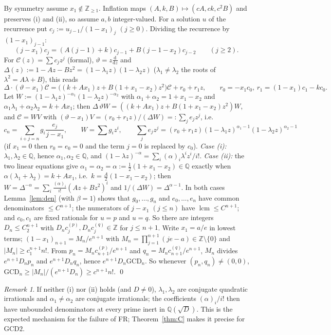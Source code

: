 \documentclass[11pt]{amsart}
\theoremstyle{definition}
\theoremstyle{remark}
\newtheorem{remark}[lemma]{Remark}
\numberwithin{equation}{section}
\newcommand{\Q}{\mathbb{Q}}
\newcommand{\Z}{\mathbb{Z}}
\newcommand{\GCD}{\mathrm{GCD}}
\newcommand{\lcm}{\operatorname{lcm}}
\begin{document}
By symmetry assume $x_1\notin\Z_{\ge1}$. Inflation maps $(A,k,B)\mapsto(cA,ck,c^2B)$ and preserves (i) and (ii), so assume $a,b$ integer-valued. For a solution $u$ of the recurrence put $c_j:=u_{j-1}/(1-x_1)_j$ $(j\ge0)$. Dividing the recurrence by $(1-x_1)_{j-1}$:
\[
(j-x_1)c_j=(A(j-1)+k)c_{j-1}+B(j-1-x_2)c_{j-2}\qquad(j\ge2).
\]
For $\mathcal C(z)=\sum c_jz^j$ (formal), $\vartheta=z\frac{\mathrm d}{\mathrm dz}$ and $\Delta(z):=1-Az-Bz^2=(1-\lambda_1z)(1-\lambda_2z)$ ($\lambda_1\neq\lambda_2$ the roots of $\lambda^2=A\lambda+B$), this reads
\[
\Delta\cdot(\vartheta-x_1)\mathcal C=\bigl((k+Ax_1)z+B(1+x_1-x_2)z^2\bigr)\mathcal C+r_0+r_1z,\qquad r_0=-x_1c_0,\ r_1=(1-x_1)c_1-kc_0 .
\]
Let $W:=(1-\lambda_1z)^{-\alpha_1}(1-\lambda_2z)^{-\alpha_2}$ with $\alpha_1+\alpha_2=1+x_1-x_2$ and $\alpha_1\lambda_1+\alpha_2\lambda_2=k+Ax_1$; then $\Delta\,\vartheta W=((k+Ax_1)z+B(1+x_1-x_2)z^2)W$, and $\mathcal C=WV$ with $(\vartheta-x_1)V=(r_0+r_1z)/(\Delta W)=:\sum_je_jz^j$, i.e.
\[
c_n=\sum_{i+j=n}g_i\frac{e_j}{j-x_1},\qquad W=\sum g_iz^i,\qquad\sum_je_jz^j=(r_0+r_1z)(1-\lambda_1z)^{\alpha_1-1}(1-\lambda_2z)^{\alpha_2-1}
\]
(if $x_1=0$ then $r_0=e_0=0$ and the term $j=0$ is replaced by $c_0$).
\emph{Case (i):} $\lambda_1,\lambda_2\in\Q$, hence $\alpha_1,\alpha_2\in\Q$, and $(1-\lambda z)^{-\alpha}=\sum_i(\alpha)_i\lambda^iz^i/i!$.
\emph{Case (ii):} the two linear equations give $\alpha_1=\alpha_2=\alpha:=\frac12(1+x_1-x_2)\in\Q$ exactly when $\alpha(\lambda_1+\lambda_2)=k+Ax_1$, i.e.\ $k=\frac A2(1-x_1-x_2)$; then $W=\Delta^{-\alpha}=\sum_i\frac{(\alpha)_i}{i!}(Az+Bz^2)^i$ and $1/(\Delta W)=\Delta^{\alpha-1}$.
In both cases Lemma~\ref{lem:den} (with $\beta=1$) shows that $g_0,\dots,g_n$ and $e_0,\dots,e_n$ have common denominators $\le C^{n+1}$; the numerators of $j-x_1$ $(j\le n)$ have $\lcm\le C^{n+1}$; and $c_0,c_1$ are fixed rationals for $u=p$ and $u=q$. So there are integers $D_n\le C_2^{n+1}$ with $D_nc^{(p)}_j,D_nc^{(q)}_j\in\Z$ for $j\le n+1$.
Write $x_1=a/e$ in lowest terms; $(1-x_1)_{n+1}=M_n/e^{n+1}$ with $M_n=\prod_{j=1}^{n+1}(je-a)\in\Z\setminus\{0\}$ and $|M_n|\ge c_1^{n+1}n!$. From $p_n=M_nc^{(p)}_{n+1}/e^{n+1}$ and $q_n=M_nc^{(q)}_{n+1}/e^{n+1}$, $M_n$ divides $e^{n+1}D_np_n$ and $e^{n+1}D_nq_n$, hence $e^{n+1}D_n\GCD_n$. So whenever $(p_n,q_n)\neq(0,0)$, $\GCD_n\ge|M_n|/(e^{n+1}D_n)\ge c^{n+1}n!$. \qed

\begin{remark}
If neither (i) nor (ii) holds (and $D\ne0$), $\lambda_1,\lambda_2$ are conjugate quadratic irrationals and $\alpha_1\neq\alpha_2$ are conjugate irrationals; the coefficients $(\alpha)_i/i!$ then have unbounded denominators at every prime inert in $\Q(\sqrt D)$. This is the expected mechanism for the failure of FR; Theorem~\ref{thm:C} makes it precise for $\GCD2$.
\end{remark}
\end{document}

